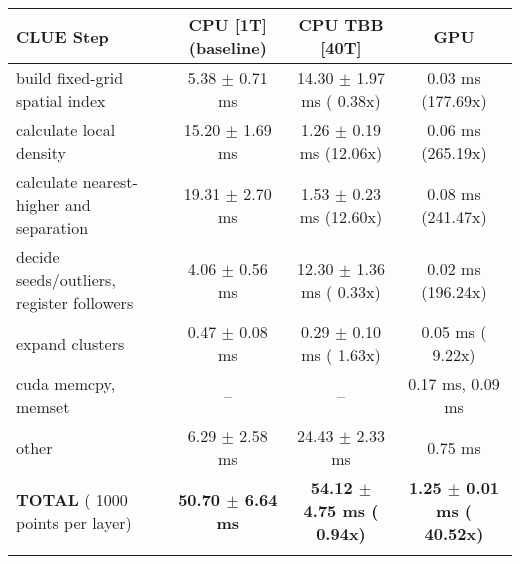     \begin{tabular}{l|c|c|c}
    \hline
    CLUE Step                                 & CPU [1T] (baseline)         & CPU TBB [40T]                         & GPU                       \\ \hline
    build fixed-grid spatial index            &   5.38 $\pm$  0.71 ms       &  14.30 $\pm$  1.97 ms ( 0.38x)        &   0.03 ms (177.69x)       \\
    calculate local density                   &  15.20 $\pm$  1.69 ms       &   1.26 $\pm$  0.19 ms (12.06x)        &   0.06 ms (265.19x)       \\
    calculate nearest-higher and separation   &  19.31 $\pm$  2.70 ms       &   1.53 $\pm$  0.23 ms (12.60x)        &   0.08 ms (241.47x)       \\
    decide seeds/outliers, register followers &   4.06 $\pm$  0.56 ms       &  12.30 $\pm$  1.36 ms ( 0.33x)        &   0.02 ms (196.24x)       \\
    expand clusters                           &   0.47 $\pm$  0.08 ms       &   0.29 $\pm$  0.10 ms ( 1.63x)        &   0.05 ms (  9.22x)       \\ \hline
    cuda memcpy, memset                       & --                          & --                                    &   0.17 ms,   0.09 ms      \\ 
    other                                     &   6.29 $\pm$  2.58 ms       &  24.43 $\pm$  2.33 ms                 &   0.75 ms                 \\ \hline
    \textbf{TOTAL} ( 1000 points per layer)   & \textbf{ 50.70 $\pm$  6.64 ms} & \textbf{ 54.12 $\pm$  4.75 ms ( 0.94x)} & \textbf{  1.25 $\pm$  0.01 ms ( 40.52x)}  \\
    \hline
    \multicolumn{4}{c}{} 
    \end{tabular}
    \linebreak



